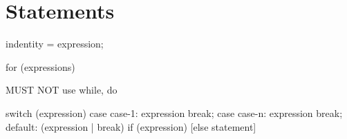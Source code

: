 \section{Statements}
indentity = expression;

for (expressions) {
}

MUST NOT use while, do

switch (expression) {
    case case-1:
        expression
        break;
    case case-n:
        expression
        break;
    default:
        (expression | break)
}
if (expression) {
} [else statement]
